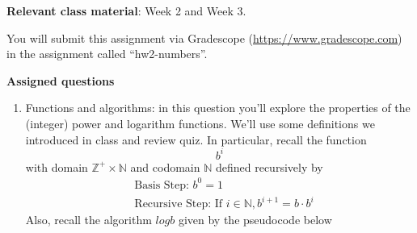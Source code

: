 {\bf Relevant class material}: Week 2 and Week 3.

You will submit this assignment via Gradescope
(\href{https://www.gradescope.com}{https://www.gradescope.com}) 
in the assignment called ``hw2-numbers''.

\instructions

{\bf Assigned questions}

\begin{enumerate}[labelindent=0pt, leftmargin=0pt]
\item Functions and algorithms: in this question you'll explore the properties of the (integer) power and logarithm
functions. We'll use some definitions we introduced in class and review quiz.
In particular, recall the function
$$b^i$$ with domain $\mathbb{Z}^+ \times \mathbb{N}$ and codomain $\mathbb{N}$ defined recursively by
\begin{align*}    
&\textrm{Basis Step: } b^0 = 1 \\
&\textrm{Recursive Step: } \textrm{If } i \in \mathbb{N}, b^{i+1} = b \cdot b^i
\end{align*}
Also, recall the algorithm $logb$ given by the pseudocode below




\end{enumerate}
